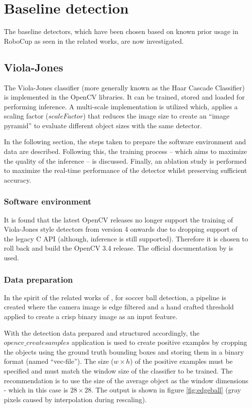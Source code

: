 \documentclass[a4paper,twoside,12pt]{report}
\begin{document}
\section{Baseline detection}

The baseline detectors, which have been chosen based on known prior usage in RoboCup as seen in the related works, are now investigated.

\subsection{Viola-Jones}

The Viola-Jones classifier (more generally known as the Haar Cascade Classifier) is implemented in the OpenCV libraries. It can be trained, stored and loaded for performing inference. A multi-scale implementation is utilized which, applies a scaling factor ($scaleFactor$) that reduces the image size to create an ``image pyramid'' to evaluate different object sizes with the same detector. 

In the following section, the steps taken to prepare the software environment and data are described. Following this, the training process -- which aims to maximize the quality of the inference -- is discussed. Finally, an ablation study is performed to maximize the real-time performance of the detector whilst preserving sufficient accuracy.

\subsubsection{Software environment}

It is found that the latest OpenCV releases no longer support the training of Viola-Jones style detectors from version 4 onwards due to dropping support of the legacy C API (although, inference is still supported). Therefore it is chosen to roll back and build the OpenCV 3.4 release. The official documentation by \cite{vjdataset} is used.

\subsubsection{Data preparation}

In the spirit of the related works of \cite{robovj}, for soccer ball detection, a pipeline is created where the camera image is edge filtered and a hand crafted threshold applied to create a crisp binary image as an input feature. 

With the detection data prepared and structured accordingly, the $opencv\_createsamples$ application is used to create positive examples by cropping the objects using the ground truth bounding boxes and storing them in a binary format (named ``vec-file''). The size ($w\times h$) of the positive examples must be specified and must match the window size of the classifier to be trained. The \cite{vjdataset} recommendation is to use the size of the average object as the window dimensions - which in this case is $28\times 28$. The output is shown in figure \ref{fig:edgeball} (gray pixels caused by interpolation during rescaling).
\end{document}
